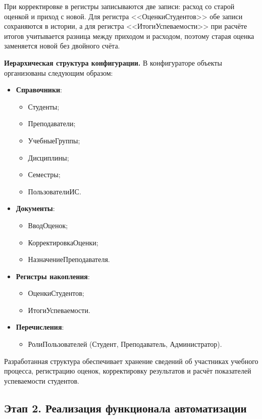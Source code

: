 \documentclass[14pt,a4paper]{extarticle}
\begin{document}
При корректировке в регистры записываются две записи: расход со старой оценкой
и приход с новой. Для регистра <<ОценкиСтудентов>> обе записи сохраняются в
истории, а для регистра <<ИтогиУспеваемости>> при расчёте итогов учитывается
разница между приходом и расходом, поэтому старая оценка заменяется новой без
двойного счёта.

\noindent\textbf{Иерархическая структура конфигурации.}
В конфигураторе объекты организованы следующим образом:

\begin{itemize}
    \item \textbf{Справочники}:
    \begin{itemize}
        \item Студенты;
        \item Преподаватели;
        \item УчебныеГруппы;
        \item Дисциплины;
        \item Семестры;
        \item ПользователиИС.
    \end{itemize}
    \item \textbf{Документы}:
    \begin{itemize}
        \item ВводОценок;
        \item КорректировкаОценки;
        \item НазначениеПреподавателя.
    \end{itemize}
    \item \textbf{Регистры накопления}:
    \begin{itemize}
        \item ОценкиСтудентов;
        \item ИтогиУспеваемости.
    \end{itemize}
    \item \textbf{Перечисления}:
    \begin{itemize}
        \item РолиПользователей (Студент, Преподаватель, Администратор).
    \end{itemize}
\end{itemize}

Разработанная структура обеспечивает хранение сведений об участниках учебного
процесса, регистрацию оценок, корректировку результатов и расчёт показателей
успеваемости студентов.

\subsection{Этап 2. Реализация функционала автоматизации}
\end{document}
